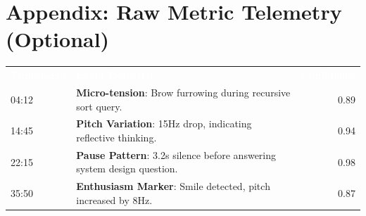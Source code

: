 \documentclass[11pt,a4paper]{article}
\begin{document}
\section*{Appendix: Raw Metric Telemetry (Optional)}

\begin{small}
\renewcommand{\arraystretch}{1.5}
\begin{tabularx}{\textwidth}{@{} l X r @{}}
  \rowcolor{WiseThemeBg}
  \textcolor{white}{\textbf{Timestamp}} & \textcolor{white}{\textbf{Event Detected}} & \textcolor{white}{\textbf{Confidence}} \\
  \rowcolor{WiseLight}
  04:12 & \textbf{Micro-tension}: Brow furrowing during recursive sort query. & 0.89 \\
  14:45 & \textbf{Pitch Variation}: 15Hz drop, indicating reflective thinking. & 0.94 \\
  \rowcolor{WiseLight}
  22:15 & \textbf{Pause Pattern}: 3.2s silence before answering system design question. & 0.98 \\
  35:50 & \textbf{Enthusiasm Marker}: Smile detected, pitch increased by 8Hz. & 0.87 \\
  \bottomrule
\end{tabularx}
\end{small}
\end{document}
